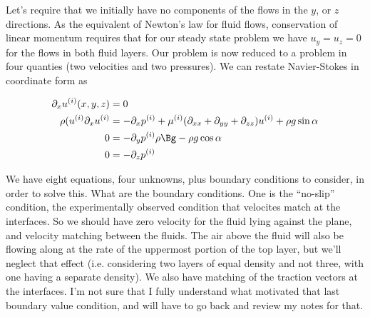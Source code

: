 Let's require that we initially have no components of the flows in the $y$, or $z$ directions.  As the equivalent of Newton's law for fluid flows, conservation of linear momentum requires that for our steady state problem we have $u_y = u_z = 0$ for the flows in both fluid layers.  Our problem is now reduced to a problem in four quanties (two velocities and two pressures).  We can restate Navier-Stokes in coordinate form as

\begin{align}\label{eqn:twoLayerInclinedFlow:n}
\partial_x u^{(i)}(x,y,z) &= 0 \\
\rho (u^{(i)} \partial_x u^{(i)} &= - \partial_x p^{(i)} + \mu^{(i)} (\partial_{xx} + \partial_{yy} + \partial_{zz}) u^{(i)} + \rho g \sin\alpha \\
0 &= - \partial_y p^{(i)} \rho \Bg - \rho g \cos\alpha \\
0 &= - \partial_z p^{(i)} 
\end{align}

We have eight equations, four unknowns, plus boundary conditions to consider, in order to solve this.  What are the boundary conditions.  One is the ``no-slip'' condition, the experimentally observed condition that velocites match at the interfaces.  So we should have zero velocity for the fluid lying against the plane, and velocity matching between the fluids.  The air above the fluid will also be flowing along at the rate of the uppermost portion of the top layer, but we'll neglect that effect (i.e. considering two layers of equal density and not three, with one having a separate density).  We also have matching of the traction vectors at the interfaces.  I'm not sure that I fully understand what motivated that last boundary value condition, and will have to go back and review my notes for that.

\EndArticle
